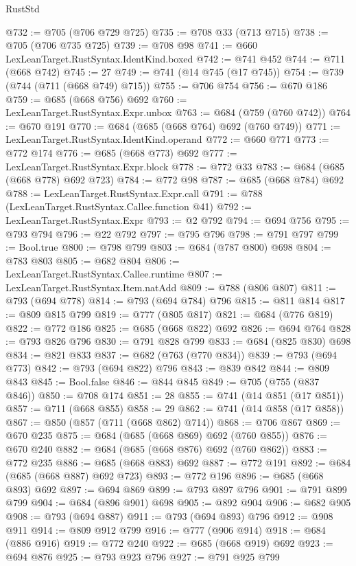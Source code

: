 \begin{lexlean}{RustStd}
\begin{coremodule}
@732 := @705 (@706 @729 @725)
@735 := @708 @33 (@713 @715)
@738 := @705 (@706 @735 @725)
@739 := @708 @98
@741 := @660 LexLeanTarget.RustSyntax.IdentKind.boxed
@742 := @741 @452
@744 := @711 (@668 @742)
@745 := 27
@749 := @741 (@14 @745 (@17 @745))
@754 := @739 (@744 (@711 (@668 @749) @715))
@755 := @706 @754
@756 := @670 @186
@759 := @685 (@668 @756) @692
@760 := LexLeanTarget.RustSyntax.Expr.unbox
@763 := @684 (@759 (@760 @742))
@764 := @670 @191
@770 := @684 (@685 (@668 @764) @692 (@760 @749))
@771 := LexLeanTarget.RustSyntax.IdentKind.operand
@772 := @660 @771
@773 := @772 @174
@776 := @685 (@668 @773) @692
@777 := LexLeanTarget.RustSyntax.Expr.block
@778 := @772 @33
@783 := @684 (@685 (@668 @778) @692 @723)
@784 := @772 @98
@787 := @685 (@668 @784) @692
@788 := LexLeanTarget.RustSyntax.Expr.call
@791 := @788 (LexLeanTarget.RustSyntax.Callee.function @41)
@792 := LexLeanTarget.RustSyntax.Expr
@793 := @2 @792
@794 := @694 @756
@795 := @793 @794
@796 := @22 @792
@797 := @795 @796
@798 := @791 @797
@799 := Bool.true
@800 := @798 @799
@803 := @684 (@787 @800) @698
@804 := @783 @803
@805 := @682 @804
@806 := LexLeanTarget.RustSyntax.Callee.runtime
@807 := LexLeanTarget.RustSyntax.Item.natAdd
@809 := @788 (@806 @807)
@811 := @793 (@694 @778)
@814 := @793 (@694 @784) @796
@815 := @811 @814
@817 := @809 @815 @799
@819 := @777 (@805 @817)
@821 := @684 (@776 @819)
@822 := @772 @186
@825 := @685 (@668 @822) @692
@826 := @694 @764
@828 := @793 @826 @796
@830 := @791 @828 @799
@833 := @684 (@825 @830) @698
@834 := @821 @833
@837 := @682 (@763 (@770 @834))
@839 := @793 (@694 @773)
@842 := @793 (@694 @822) @796
@843 := @839 @842
@844 := @809 @843
@845 := Bool.false
@846 := @844 @845
@849 := @705 (@755 (@837 @846))
@850 := @708 @174
@851 := 28
@855 := @741 (@14 @851 (@17 @851))
@857 := @711 (@668 @855)
@858 := 29
@862 := @741 (@14 @858 (@17 @858))
@867 := @850 (@857 (@711 (@668 @862) @714))
@868 := @706 @867
@869 := @670 @235
@875 := @684 (@685 (@668 @869) @692 (@760 @855))
@876 := @670 @240
@882 := @684 (@685 (@668 @876) @692 (@760 @862))
@883 := @772 @235
@886 := @685 (@668 @883) @692
@887 := @772 @191
@892 := @684 (@685 (@668 @887) @692 @723)
@893 := @772 @196
@896 := @685 (@668 @893) @692
@897 := @694 @869
@899 := @793 @897 @796
@901 := @791 @899 @799
@904 := @684 (@896 @901) @698
@905 := @892 @904
@906 := @682 @905
@908 := @793 (@694 @887)
@911 := @793 (@694 @893) @796
@912 := @908 @911
@914 := @809 @912 @799
@916 := @777 (@906 @914)
@918 := @684 (@886 @916)
@919 := @772 @240
@922 := @685 (@668 @919) @692
@923 := @694 @876
@925 := @793 @923 @796
@927 := @791 @925 @799

\end{coremodule}
\end{lexlean}
